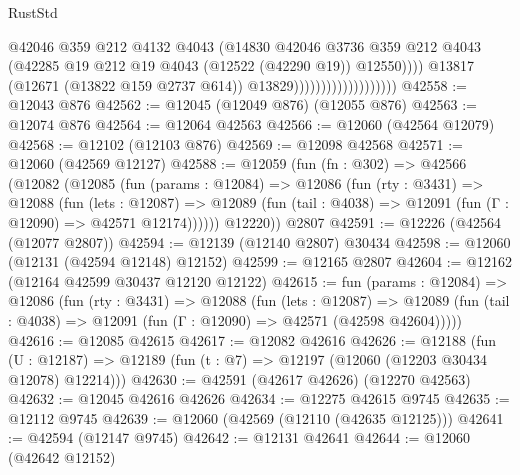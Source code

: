 \begin{lexlean}{RustStd}
\begin{coremodule}
                                              @42046
                                              @359
                                              @212
                                              @4132
                                              @4043
                                              (@14830
                                                @42046
                                                @3736
                                                @359
                                                @212
                                                @4043
                                                (@42285
                                                  @19
                                                  @212
                                                  @19
                                                  @4043
                                                  (@12522 (@42290 @19))
                                                  @12550))))
                                          @13817
                                          (@12671 (@13822 @159 @2737 @614))
                                          @13829)))))))))))))))))))
@42558 := @12043 @876
@42562 := @12045 (@12049 @876) (@12055 @876)
@42563 := @12074 @876
@42564 := @12064 @42563
@42566 := @12060 (@42564 @12079)
@42568 := @12102 (@12103 @876)
@42569 := @12098 @42568
@42571 := @12060 (@42569 @12127)
@42588 := @12059
    (fun (fn : @302) =>
    @42566
      (@12082
        (@12085
          (fun (params : @12084) =>
          @12086
            (fun (rty : @3431) =>
            @12088
              (fun (lets : @12087) =>
              @12089 (fun (tail : @4038) => @12091 (fun (Γ : @12090) => @42571 @12174))))))
        @12220))
    @2807
@42591 := @12226 (@42564 (@12077 @2807))
@42594 := @12139 (@12140 @2807) @30434
@42598 := @12060 (@12131 (@42594 @12148) @12152)
@42599 := @12165 @2807
@42604 := @12162 (@12164 @42599 @30437 @12120 @12122)
@42615 := fun (params : @12084) =>
  @12086
    (fun (rty : @3431) =>
    @12088
      (fun (lets : @12087) =>
      @12089 (fun (tail : @4038) => @12091 (fun (Γ : @12090) => @42571 (@42598 @42604)))))
@42616 := @12085 @42615
@42617 := @12082 @42616
@42626 := @12188
    (fun (U : @12187) => @12189 (fun (t : @7) => @12197 (@12060 (@12203 @30434 @12078) @12214)))
@42630 := @42591 (@42617 @42626) (@12270 @42563)
@42632 := @12045 @42616 @42626
@42634 := @12275 @42615 @9745
@42635 := @12112 @9745
@42639 := @12060 (@42569 (@12110 (@42635 @12125)))
@42641 := @42594 (@12147 @9745)
@42642 := @12131 @42641
@42644 := @12060 (@42642 @12152)

\end{coremodule}
\end{lexlean}

